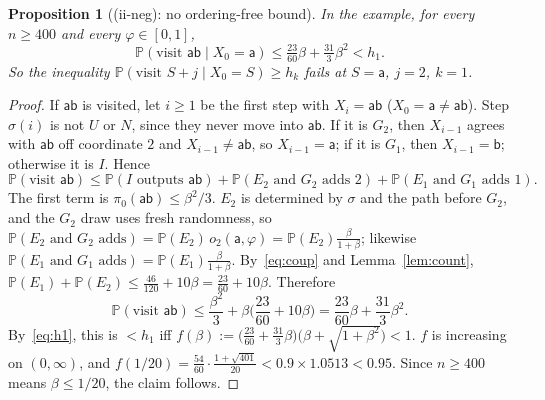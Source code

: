 \documentclass[11pt]{article}
\newtheorem{proposition}[theorem]{Proposition}
\theoremstyle{definition}
\renewcommand{\Pr}{\mathbb P}
\newcommand{\ph}{\varphi}
\newcommand{\sa}{\mathsf a}
\newcommand{\sbb}{\mathsf b}
\newcommand{\sab}{\mathsf{ab}}
\begin{document}
\begin{proposition}[(ii-neg): no ordering-free bound]\label{prop:neg}
In the example, for every $n\ge400$ and every $\ph\in[0,1]$,
\[
\Pr(\text{visit }\sab\mid X_0=\sa)\le\tfrac{23}{60}\beta+\tfrac{31}{3}\beta^2<h_1 .
\]
So the inequality $\Pr(\text{visit }S+j\mid X_0=S)\ge h_k$ fails at $S=\sa$, $j=2$, $k=1$.
\end{proposition}
\begin{proof}
If $\sab$ is visited, let $i\ge1$ be the first step with $X_i=\sab$ ($X_0=\sa\ne\sab$). Step $\sigma(i)$ is not $U$ or $N$, since they never move into $\sab$. If it is $G_2$, then $X_{i-1}$ agrees with $\sab$ off coordinate $2$ and $X_{i-1}\ne\sab$, so $X_{i-1}=\sa$; if it is $G_1$, then $X_{i-1}=\sbb$; otherwise it is $I$. Hence
\[
\Pr(\text{visit }\sab)\le\Pr(I\text{ outputs }\sab)+\Pr(E_2\text{ and }G_2\text{ adds }2)+\Pr(E_1\text{ and }G_1\text{ adds }1).
\]
The first term is $\pi_0(\sab)\le\beta^2/3$. $E_2$ is determined by $\sigma$ and the path before $G_2$, and the $G_2$ draw uses fresh randomness, so $\Pr(E_2\text{ and }G_2\text{ adds})=\Pr(E_2)\,o_2(\sa,\ph)=\Pr(E_2)\frac{\beta}{1+\beta}$; likewise $\Pr(E_1\text{ and }G_1\text{ adds})=\Pr(E_1)\frac\beta{1+\beta}$. By~\eqref{eq:coup} and Lemma~\ref{lem:count}, $\Pr(E_1)+\Pr(E_2)\le\frac{46}{120}+10\beta=\frac{23}{60}+10\beta$. Therefore
\[
\Pr(\text{visit }\sab)\le\frac{\beta^2}3+\beta\Big(\frac{23}{60}+10\beta\Big)=\frac{23}{60}\beta+\frac{31}3\beta^2 .
\]
By~\eqref{eq:h1}, this is $<h_1$ iff $f(\beta):=\big(\frac{23}{60}+\frac{31}{3}\beta\big)\big(\beta+\sqrt{1+\beta^2}\big)<1$. $f$ is increasing on $(0,\infty)$, and $f(1/20)=\frac{54}{60}\cdot\frac{1+\sqrt{401}}{20}<0.9\times1.0513<0.95$. Since $n\ge400$ means $\beta\le1/20$, the claim follows.
\end{proof}
\end{document}
